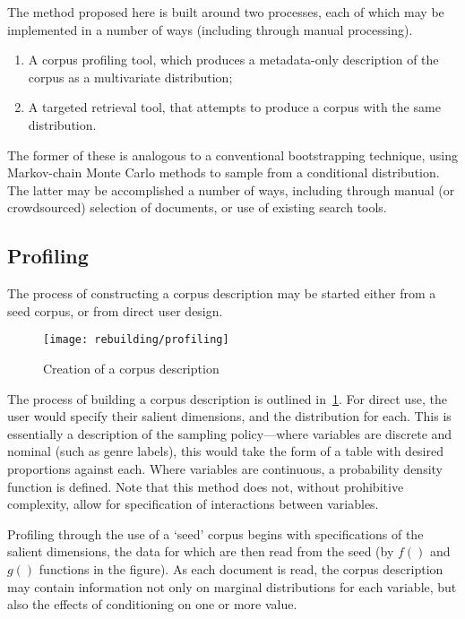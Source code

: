 
The method proposed here is built around two processes, each of which may be implemented in a number of ways (including through manual processing).

\begin{enumerate}
    \item A corpus profiling tool, which produces a metadata-only description of the corpus as a multivariate distribution;
    \item A targeted retrieval tool, that attempts to produce a corpus with the same distribution.
\end{enumerate}

The former of these is analogous to a conventional bootstrapping technique, using Markov-chain Monte Carlo methods to sample from a conditional distribution.  The latter may be accomplished a number of ways, including through manual (or crowdsourced) selection of documents, or use of existing search tools.

\subsection{Profiling}
The process of constructing a corpus description may be started either from a seed corpus, or from direct user design.

\begin{figure}[h]
    \centering
    \texttt{[image: rebuilding/profiling]}
    \caption{Creation of a corpus description}
    \label{fig:rebuilding:profiling}
\end{figure}


The process of building a corpus description is outlined in~\ref{fig:rebuilding:profiling}.  For direct use, the user would specify their salient dimensions, and the distribution for each.  This is essentially a description of the sampling policy---where variables are discrete and nominal (such as genre labels), this would take the form of a table with desired proportions against each.  Where variables are continuous, a probability density function is defined.  Note that this method does not, without prohibitive complexity, allow for specification of interactions between variables.

Profiling through the use of a `seed' corpus begins with specifications of the salient dimensions, the data for which are then read from the seed (by $f()$ and $g()$ functions in the figure).  As each document is read, the corpus description may contain information not only on marginal distributions for each variable, but also the effects of conditioning on one or more value.

